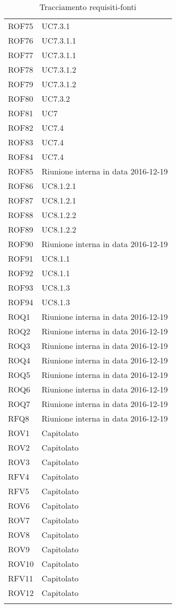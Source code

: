 \documentclass[../AnalisiDeiRequisiti_v4.0.0.tex]{subfiles}
\begin{document}
\begin{longtable}{p{4cm}!{\VRule[1pt]}p{4cm}}
ROF75 & UC7.3.1 \\
ROF76 & UC7.3.1.1 \\
ROF77 & UC7.3.1.1 \\
ROF78 & UC7.3.1.2 \\
ROF79 & UC7.3.1.2 \\
ROF80 & UC7.3.2 \\
ROF81 & UC7 \\
ROF82 & UC7.4 \\
ROF83 & UC7.4 \\
ROF84 & UC7.4 \\
ROF85 & Riunione interna in data 2016-12-19 \\
ROF86 & UC8.1.2.1 \\
ROF87 & UC8.1.2.1 \\
ROF88 & UC8.1.2.2 \\
ROF89 & UC8.1.2.2 \\
ROF90 & Riunione interna in data 2016-12-19 \\
ROF91 & UC8.1.1 \\
ROF92 & UC8.1.1 \\
ROF93 & UC8.1.3 \\
ROF94 & UC8.1.3 \\
ROQ1 & Riunione interna in data 2016-12-19 \\
ROQ2 & Riunione interna in data 2016-12-19 \\
ROQ3 & Riunione interna in data 2016-12-19 \\
ROQ4 & Riunione interna in data 2016-12-19 \\
ROQ5 & Riunione interna in data 2016-12-19 \\
ROQ6 & Riunione interna in data 2016-12-19 \\
ROQ7 & Riunione interna in data 2016-12-19 \\
RFQ8 & Riunione interna in data 2016-12-19 \\
ROV1 & Capitolato \\
ROV2 & Capitolato \\
ROV3 & Capitolato \\
RFV4 & Capitolato \\
RFV5 & Capitolato \\
ROV6 & Capitolato \\
ROV7 & Capitolato \\
ROV8 & Capitolato \\
ROV9 & Capitolato \\
ROV10 & Capitolato \\
RFV11 & Capitolato \\
ROV12 & Capitolato \\
\caption{Tracciamento requisiti-fonti}
\end{longtable}
\end{document}

